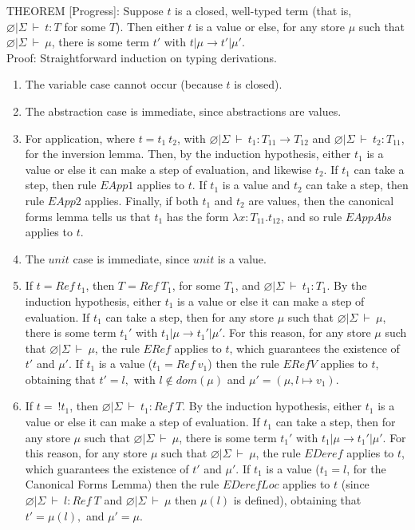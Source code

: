 \documentclass{article}
\newcommand{\tto}{\longrightarrow}
\newcommand{\envE}{{\varnothing | \Sigma \ \vdash}}
\begin{document}
THEOREM [Progress]: Suppose $t$ is a closed, well-typed term (that is, $ \envE \ t : T$ for some $T$). Then either $t$ is a value or else, for any store $\mu$ such that $\envE \ \mu$, there is some term $t'$ with $t|\mu \tto t'|\mu'$.\\
Proof: Straightforward induction on typing derivations.
\begin{enumerate}
\item The variable case cannot occur (because $t$ is closed).
\item The abstraction case is immediate, since abstractions are values.
\item For application, where $t = t_1 \ t_2$, with $\envE \ t_1 : T_{11} \tto T_{12}$ and $\envE \ t_2 : T_{11}$, for the inversion lemma. Then, by the induction hypothesis, either $t_1$ is a value or else it can make a step of evaluation, and likewise $t_2$. If $t_1$ can take a step, then rule $EApp1$ applies to $t$. If $t_1$ is a value and $t_2$ can take a step, then rule $EApp2$ applies. Finally, if both $t_1$ and $t_2$ are values, then the canonical forms lemma tells us that $t_1$ has the form $\lambda x: T_{11}.t_{12}$, and so rule $EAppAbs$ applies to $t$.
\item The $unit$ case is immediate, since $unit$ is a value.
\item If $t = Ref \ t_1$, then $T = Ref \ T_1$, for some $T_1$, and $\envE \ t_1 : T_1$. By the induction hypothesis, either $t_1$ is a value or else it can make a step of evaluation. If $t_1$ can take a step, then for any store $\mu$ such that $\envE \ \mu$, there is some term $t_1'$ with $t_1|\mu \tto t_1'|\mu'$. For this reason, for any store $\mu$ such that $\envE \ \mu$, the rule $ERef$ applies to $t$, which guarantees the existence of $t'$ and $\mu'$. If $t_1$ is a value ($t_1 = Ref \ v_1$) then the rule $ERefV$ applies to $t$, obtaining that $t' = l,$ with $l \not\in dom(\mu)$ and $\mu' = (\mu, l \mapsto v_1)$.
\item If $t = \ !t_1$, then $\envE \ t_1 : Ref \ T$. By the induction hypothesis, either $t_1$ is a value or else it can make a step of evaluation. If $t_1$ can take a step, then for any store $\mu$ such that $\envE \ \mu$, there is some term $t_1'$ with $t_1|\mu \tto t_1'|\mu'$. For this reason, for any store $\mu$ such that $\envE \ \mu$, the rule $EDeref$ applies to $t$, which guarantees the existence of $t'$ and $\mu'$. If $t_1$ is a value ($t_1 = l$, for the Canonical Forms Lemma) then the rule $EDerefLoc$ applies to $t$ (since $\envE \ l : Ref \ T$ and $\envE \ \mu$ then $\mu(l)$ is defined), obtaining that $t' = \mu(l),$ and $\mu' = \mu$.

\end{enumerate}
\end{document}
